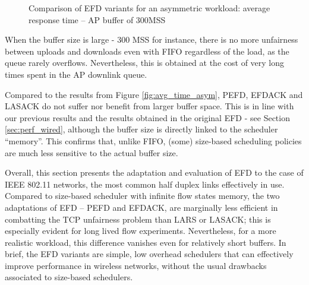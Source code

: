 \documentclass[preprint,12pt]{elsarticle}
\begin{document}
\begin{figure}[ht!]
  \centering
  \caption{Comparison of EFD variants for an asymmetric workload: average response time --  AP buffer of 300MSS}
  \label{fig:asym_buffer}
\end{figure}

When the buffer size is large - 300 MSS for instance, there is no more unfairness between uploads and downloads even with FIFO regardless of the load, as the queue rarely overflows. Nevertheless, this is obtained at the cost of very long times spent in the AP downlink queue. 

Compared to the results from Figure \ref{fig:avg_time_asym}, PEFD, EFDACK and LASACK do not suffer nor benefit from larger buffer space. This is in line with our previous results and the results obtained in the original EFD - see Section \ref{sec:perf_wired}, although the buffer size is directly linked to the scheduler ``memory''. This confirms that, unlike FIFO, (some) size-based scheduling policies are much less sensitive to the actual buffer size. 

Overall, this section presents the adaptation and evaluation of EFD to the case of IEEE 802.11 networks, the most common half duplex links effectively in use. Compared to size-based scheduler with infinite flow states memory, the two adaptations of EFD -- PEFD and EFDACK, are marginally less efficient in combatting the TCP unfairness problem than LARS or LASACK; this is especially evident for long lived flow experiments. Nevertheless, for a more realistic workload,  this difference vanishes even for relatively short buffers. In brief, the EFD variants are simple, low overhead  schedulers that can effectively improve performance in wireless networks, without the usual drawbacks associated to size-based schedulers.
\end{document}
